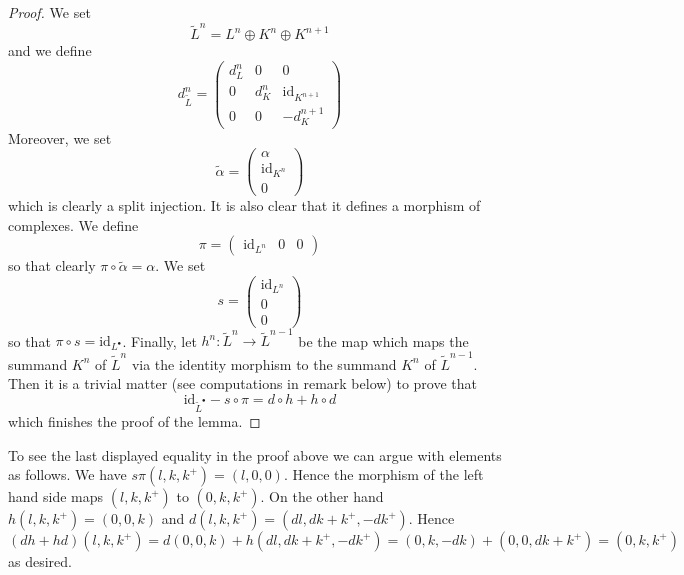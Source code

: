 \begin{proof}
We set
$$
\tilde L^n = L^n \oplus K^n \oplus K^{n + 1}
$$
and we define
$$
d^n_{\tilde L} =
\left(
\begin{matrix}
d^n_L & 0 & 0 \\
0 & d^n_K & \text{id}_{K^{n + 1}} \\
0 & 0 & -d^{n + 1}_K
\end{matrix}
\right)
$$
Moreover, we set
$$
\tilde \alpha =
\left(
\begin{matrix}
\alpha \\
\text{id}_{K^n} \\
0
\end{matrix}
\right)
$$
which is clearly a split injection. It is also clear that it defines a morphism
of complexes. We define
$$
\pi =
\left(
\begin{matrix}
\text{id}_{L^n} &
0 &
0
\end{matrix}
\right)
$$
so that clearly $\pi \circ \tilde \alpha = \alpha$. We set
$$
s =
\left(
\begin{matrix}
\text{id}_{L^n} \\
0 \\
0
\end{matrix}
\right)
$$
so that $\pi \circ s = \text{id}_{L^\bullet}$. Finally,
let $h^n : \tilde L^n \to \tilde L^{n - 1}$ be the map
which maps the summand $K^n$ of $\tilde L^n$ via the identity morphism
to the summand $K^n$ of $\tilde L^{n - 1}$. Then it is a trivial matter
(see computations in remark below) to prove that
$$
\text{id}_{\tilde L^\bullet} - s \circ \pi
=
d \circ h + h \circ d
$$
which finishes the proof of the lemma.
\end{proof}

\begin{remark}
\label{remark-compute-modules}
To see the last displayed equality in the proof above we can argue
with elements as follows. We have
$s\pi(l, k, k^{+}) = (l, 0, 0)$.
Hence the morphism of the left hand side maps
$(l, k, k^{+})$ to $(0, k, k^{+})$.
On the other hand $h(l, k, k^{+}) = (0, 0, k)$ and
$d(l, k, k^{+}) = (dl, dk + k^{+}, -dk^{+})$.
Hence $(dh + hd)(l, k, k^{+}) =
d(0, 0, k) + h(dl, dk + k^{+}, -dk^{+}) =
(0, k, -dk) + (0, 0, dk + k^{+}) = (0, k, k^{+})$
as desired.
\end{remark}

